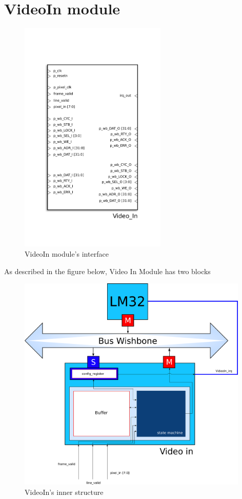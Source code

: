 
\section{VideoIn module}
\begin{figure}[H]
\center
\includegraphics[width=7cm]{figs/Video_in.pdf}
\caption{VideoIn module's interface}
\label{VideoIn_interface}
\end{figure}

As described in the figure below, Video In Module has two blocks 

\begin{figure}[h]
\center
\includegraphics[width=11cm]{figs/Video_In_blocks.pdf}
\caption{VideoIn's inner structure}
\label{VideoIn_struct}
\end{figure}


